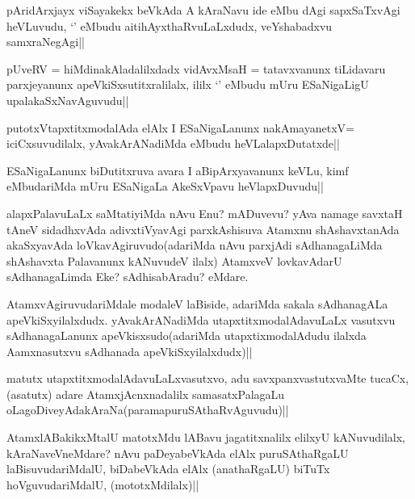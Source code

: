 \begin{artha}
pAridArxjayx viSayakekx beVkAda A kAraNavu ide eMbu dAgi sapxSaTxvAgi heVLuvudu, `\stext' eMbudu aitihAyxthaRvuLaLxdudx, veYshabadxvu samxraNegAgi||
\end{artha}

\begin{artha}
pUveRV = hiMdinakAladalilxdadx vidAvxMsaH = tatavxvanunx tiLidavaru parxjeyanunx apeVkiSxsutitxralilalx, ililx `\stext' eMbudu mUru ESaNigaLigU upalakaSxNavAguvudu||
\end{artha}

\begin{artha}
putotxVtapxtitxmodalAda elAlx I ESaNigaLanunx nakAmayanetxV= iciCxsuvudilalx, yAvakArANadiMda eMbudu heVLalapxDutatxde||
\end{artha}

\begin{artha}
ESaNigaLanunx biDutitxruva avara I aBipArxyavanunx keVLu, kimf  eMbudariMda mUru ESaNigaLa AkeSxVpavu heVlapxDuvudu||
\end{artha}

\begin{artha}
alapxPalavuLaLx saMtatiyiMda nAvu Enu? mADuvevu? yAva namage savxtaH tAneV sidadhxvAda adivxtiVyavAgi parxkAshisuva Atamxnu shAshavxtanAda akaSxyavAda loVkavAgiruvudo(adariMda nAvu parxjAdi sAdhanagaLiMda shAshavxta Palavanunx kANuvudeV ilalx) AtamxveV lovkavAdarU sAdhanagaLimda Eke? sAdhisabAradu? eMdare.
\end{artha}

\begin{artha}
AtamxvAgiruvudariMdale modaleV laBiside, adariMda sakala sAdhanagALa apeVkiSxyilalxdudx. yAvakArANadiMda utapxtitxmodalAdavuLaLx vasutxvu sAdhanagaLanunx apeVkisxsudo(adariMda utapxtixmodalAdudu ilalxda Aamxnasutxvu sAdhanada apeVkiSxyilalxdudx)||
\end{artha}

\begin{artha}
matutx utapxtitxmodalAdavuLaLxvasutxvo, adu savxpanxvastutxvaMte tucaCx, (asatutx) adare AtamxjAcnxnadalilx samasatxPalagaLu oLagoDiveyAdakAraNa(paramapuruSAthaRvAguvudu)||
\end{artha}


\begin{artha}
AtamxlABakikxMtalU matotxMdu lABavu jagatitxnalilx elilxyU kANuvudilalx, kAraNaveVneMdare? nAvu paDeyabeVkAda elAlx puruSAthaRgaLU laBisuvudariMdalU, biDabeVkAda elAlx (anathaRgaLU) biTuTx hoVguvudariMdalU, (mototxMdilalx)||
\end{artha}

